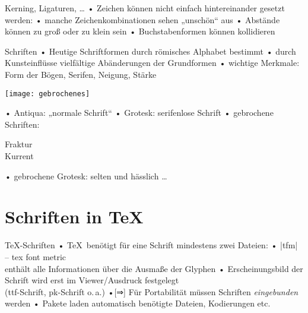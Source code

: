 \begin{frame}{Kerning, Ligaturen, …}
• Zeichen können nicht einfach hintereinander gesetzt werden:
• manche Zeichenkombinationen sehen „unschön“ aus
• Abstände können zu groß oder zu klein sein
• Buchstabenformen können kollidieren
\•
\end{frame}

\begin{frame}{Schriften}
• Heutige Schriftformen durch römisches Alphabet bestimmt
• durch Kunsteinflüsse vielfältige Abänderungen der Grundformen
• wichtige Merkmale: Form der Bögen, Serifen, Neigung, Stärke
\•
\end{frame}

\begin{frame}[plain]
\parbox[b]{.7\textwidth}{
\texttt{[image: gebrochenes]}%
}%
\parbox[b]{.3\textwidth}{
• Antiqua: \textrm{„normale Schrift“}
• Grotesk: \textsf{serifenlose Schrift}
• gebrochene Schriften: \parbox[t]{5cm}{%
 Fraktur\\%
\large Kurrent
}
• gebrochene Grotesk: selten und hässlich …
\•
\vspace*{2cm}
}
\end{frame}

\section{Schriften in \TeX}
\begin{frame}[fragile]{\TeX-Schriften}
• \TeX\ benötigt für eine Schrift mindestens zwei Dateien:
• |tfm| – tex font metric%
\\ enthält alle Informationen über die Ausmaße der Glyphen
• Erscheinungsbild der Schrift wird erst im Viewer/Ausdruck festgelegt\\
(ttf-Schrift, pk-Schrift o.\,a.)
•[⇒] Für Portabilität müssen Schriften \emph{eingebunden} werden
• Pakete laden automatisch benötigte Dateien, Kodierungen etc.
\• 
\end{frame}

